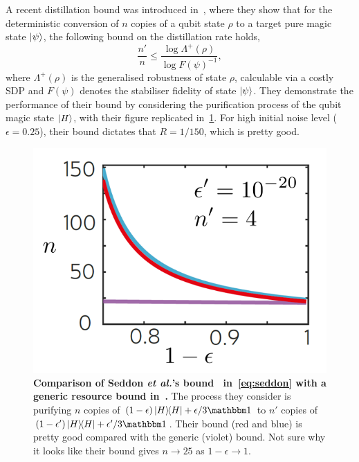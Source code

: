 \documentclass[pra,
aps,
twocolumn,
superscriptaddress,
groupedaddress,
nofootinbib,
reprint
]{revtex4-1}
\begin{document}
A recent distillation bound was introduced in~\cite{Seddon2020}, where they show that for the deterministic conversion of $n$ copies of a qubit state $\rho$ to a target pure magic state $\ket{\psi}$, the following bound on the distillation rate holds,
\begin{equation}\label{eq:seddon}
	\frac{n'}{n} \leq \frac{\log{\Lambda^+(\rho)}}{\log{F(\psi)^{-1}}},
\end{equation}
where $\Lambda^+(\rho)$ is the generalised robustness of state $\rho$, calculable via a costly SDP and $F(\psi)$ denotes the stabiliser fidelity of state $\ket{\psi}$.
They demonstrate the performance of their bound by considering the purification process of the qubit magic state $\ket{H}$, with their figure replicated in~\cref{fig:seddon}. 
For high initial noise level ($\epsilon = 0.25$), their bound dictates that $R = 1/150$, which is pretty good.
\begin{figure}[h]
    \centering
    \includegraphics[scale=0.3]{figs/seddon.png}
    \caption{\textbf{Comparison of Seddon \textit{et al.}'s bound~\cite{Seddon2020} in~\cref{eq:seddon} with a generic resource bound in~\cite{Fang2020}.}
    The process they consider is purifying $n$ copies of $(1-\epsilon)\ketbra{H} + \epsilon/3 \id$ to $n'$ copies of $(1-\epsilon')\ketbra{H} + \epsilon'/3 \id$.
    Their bound (red and blue) is pretty good compared with the generic (violet) bound.
    Not sure why it looks like their bound gives $n\rightarrow 25$ as $1-\epsilon \rightarrow 1$.
    }
    \label{fig:seddon}
\end{figure}
\end{document}
